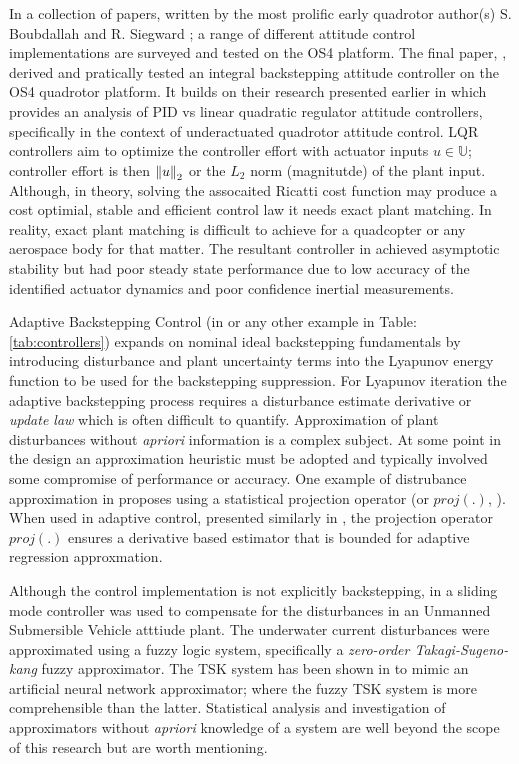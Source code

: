 \par
\vspace{-15pt}
In a collection of papers, written by the most prolific early quadrotor author(s) S. Boubdallah and R. Siegward \cite{pidlqr,indoorslidingmode, fullquadcoptercontrol}; a range of different attitude control implementations are surveyed and tested on the OS4 platform. The final paper, \cite{fullquadcoptercontrol}, derived and pratically tested an integral backstepping attitude controller on the OS4 quadrotor platform. It builds on their research presented earlier in \cite{pidlqr} which provides an analysis of PID vs linear quadratic regulator attitude controllers, specifically in the context of underactuated quadrotor attitude control. LQR controllers aim to optimize the controller effort with actuator inputs $u\in\mathbb{U}$; controller effort is then $\left\lVert u\right\rVert_2$ or the $L_2$ norm (magnitutde) of the plant input. Although, in theory, solving the assocaited Ricatti cost function may produce a cost optimial, stable and efficient control law it needs exact plant matching. In reality, exact plant matching is difficult to achieve for a quadcopter or any aerospace body for that matter. The resultant controller in \cite{pidlqr} achieved asymptotic stability but had poor steady state performance due to low accuracy of the identified actuator dynamics and poor confidence inertial measurements.
\par
Adaptive Backstepping Control (in \cite{backstepping} or any other example in Table:\ref{tab:controllers}) expands on nominal ideal backstepping fundamentals by introducing disturbance and plant uncertainty terms into the Lyapunov energy function to be used for the backstepping suppression. For Lyapunov iteration the adaptive backstepping process requires a disturbance estimate derivative or \emph{update law} which is often difficult to quantify. Approximation of plant disturbances without \emph{apriori} information is a complex subject. At some point in the design an approximation heuristic must be adopted and typically involved some compromise of performance or accuracy. One example of distrubance approximation in \cite{nonlinearadaptive} proposes using a statistical projection operator (or $proj(.)$, \cite{adaptiveregulation}). When used in adaptive control, presented similarly in \cite{outputfeedback}, the projection operator $proj(.)$ ensures a derivative based estimator that is bounded for adaptive regression approxmation\cite{nonlinearregression}.
\par
Although the control implementation is not explicitly backstepping, in \cite{adaptiveslidingmode} a sliding mode controller was used to compensate for the disturbances in an Unmanned Submersible Vehicle atttiude plant. The underwater current disturbances were approximated using a fuzzy logic system, specifically a \emph{zero-order Takagi-Sugeno-kang} fuzzy approximator. The TSK system has been shown in \cite{zeroTSK} to mimic an artificial neural network approximator; where the fuzzy TSK system is more comprehensible than the latter. Statistical analysis and investigation of approximators without \emph{apriori} knowledge of a system are well beyond the scope of this research but are worth mentioning.
